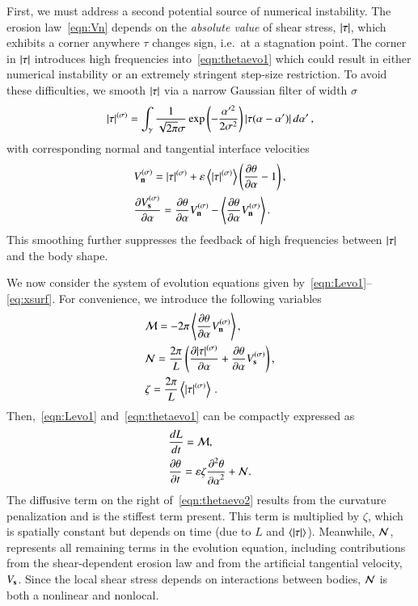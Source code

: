 \documentclass[preprint, 10pt]{elsarticle}
\begin{document}
First, we must address a second potential source of numerical
instability. The erosion law~\eqref{eqn:Vn} depends on the {\em absolute
value} of shear stress, $\lvert \tau \rvert$, which exhibits a corner anywhere $\tau$
changes sign, i.e.~at a stagnation point. The corner in $\lvert \tau \rvert$
introduces high frequencies into~\eqref{eqn:thetaevo1} which could result in either numerical instability or an extremely stringent step-size restriction. To avoid these difficulties, we smooth $\lvert \tau \rvert$ via a narrow Gaussian filter of width $\sigma$
\begin{align}
\lvert \tau \rvert^{(\sigma)} = \int_{\gamma} \frac{1}{\sqrt{2\pi} \sigma}
 \exp \left(- \frac{\alpha'^2}{2 \sigma^2}\right) \lvert  \tau(\alpha - \alpha')  \rvert \, d\alpha' \, ,
\end{align}
with corresponding normal and tangential interface velocities
\begin{align}
& V_{\mathbf{n}}^{(\sigma)} = \lvert \tau \rvert^{(\sigma)} +  \varepsilon \left< \lvert \tau \rvert^{(\sigma)} \right>
\left(\frac{\partial \theta}{\partial \alpha} - 1 \right), \\
& \frac{\partial V_{\mathbf{s}}^{(\sigma)}}{\partial \alpha} = \frac{\partial \theta}{\partial \alpha} V_{\mathbf{n}}^{(\sigma)} - \left< \frac{\partial \theta}{\partial \alpha} V_{\mathbf{n}}^{(\sigma)} \right>.
\end{align}
This smoothing further suppresses the feedback of high frequencies between $\lvert \tau \rvert$ and the body shape.

We now consider the system of evolution equations given by~\eqref{eqn:Levo1}--\eqref{eq:xsurf}. For convenience, we introduce the following variables
\begin{align}
& \mathcal{M} = - 2 \pi \left< \frac{\partial \theta}{\partial \alpha} V_{\mathbf{n}}^{(\sigma)} \right>, \\
& \mathcal{N} = \frac{2 \pi}{L} \left( \frac{\partial \lvert \tau \rvert^{(\sigma)}}{\partial \alpha} + \frac{\partial \theta}{\partial \alpha}
V_{\mathbf{s}}^{(\sigma)} \right), \\
& \zeta = \frac{2 \pi}{L}  \left< \lvert \tau \rvert^{(\sigma)} \right> \, .
\end{align}
Then,~\eqref{eqn:Levo1} and~\eqref{eqn:thetaevo1} can be compactly expressed as
\begin{align}
\label{eqn:Levo2}
& \frac{d L}{d t} = \mathcal{M}, \\
\label{eqn:thetaevo2}
& \frac{\partial \theta}{\partial t} = \varepsilon \zeta \frac{\partial^2 \theta}{{\partial \alpha}^2} + \mathcal{N}.
\end{align}
The diffusive term on the right of~\eqref{eqn:thetaevo2} results from the curvature penalization and is the stiffest term present. This term is multiplied by $\zeta$, which is spatially constant but depends on time (due to $L$ and $\left< \lvert \tau \rvert \right>$). Meanwhile, $\mathcal{N}$, represents all remaining terms in the evolution equation, including contributions from the shear-dependent erosion law and from the artificial tangential velocity, $V_{\mathbf{s}}$. Since the local shear stress depends on interactions between bodies, $\mathcal{N}$ is both a nonlinear and nonlocal.
\end{document}
